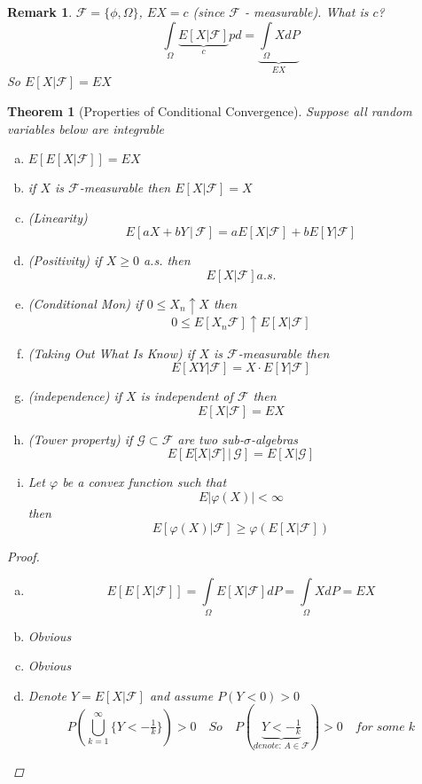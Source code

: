 \documentclass[12pt]{article}
\def\FF{\mathbb{F}}
\def\FF{\mathcal{F}}
\newtheorem{theorem}{Theorem}[section]
\newtheorem*{remark}{Remark}
\begin{document}
\begin{framed} \begin{remark}
$\mathcal{F} = \{\phi, \Omega\}$, $EX = c$ (since $\mathcal{F}$ - measurable). What is $c$?
\[\int\limits_{\Omega}\underbrace{E[X|\mathcal{F}]}_{c}pd = \underbrace{\int\limits_{\Omega}XdP}_{EX}\]
So $E[X|\mathcal{F}] = EX$
\end{remark}
\end{framed}

\begin{theorem}[Properties of Conditional Convergence]
Suppose all random variables below are integrable
\begin{enumerate}[(a)]
\item $E\left[E[X|\FF]\right] = EX$
\item if $X$ is $\FF$-measurable then $E[X|\FF]=X$
\item (Linearity) \[E[aX + bY \, |\,\FF] = aE[X|\FF] + bE[Y|\FF]\]
\item (Positivity) if $X\geq 0$ a.s. then \[E[X |\FF] a.s.\] 
\item (Conditional Mon) if $0 \leq X_n \uparrow X$ then 
\[0\leq E[X_n \FF] \uparrow E[X |\FF]\]
\item (Taking Out What Is Know) if $X$ is $\FF$-measurable then 
\[E[XY|\FF] = X\cdot E[Y|\FF]\]
\item (independence)  if $X$ is  independent of $\FF$ then 
\[E[X|\FF] = EX\]
\item (Tower property) if $\mathcal{G}\subset \FF$ are two sub-$\sigma$-algebras
\[E\left[E[X|\FF] \,| \,\mathcal{G}\right] = E[X|\mathcal{G}] \] 
\item Let $\varphi$ be a convex function such that
\[E|\varphi(X)|< \infty\]
then
\[E[\varphi(X)|\FF] \geq \varphi\left( E[X|\FF]\right) \]
\end{enumerate}
\begin{proof}\quad \\ \begin{enumerate}[(a):]
\item \[E\left[E[X|\FF]\right] =\int\limits_{\Omega}E[X|\FF] dP =\int\limits_{\Omega}XdP =  EX\]
\item Obvious\\
\item Obvious \\
\item Denote $Y = E[X|\FF]$ and assume $P(Y<0)>0$
\[P\left(\bigcup_{k=1}^{\infty} \{Y<-\tfrac{1}{k}\}\right) >0 \quad So \quad P\left( \underbrace{Y < -\tfrac{1}{k}}_{denote:\, A \in \FF} \right) > 0 \quad for \; some \; k \]

\end{enumerate}
\end{proof}
\end{theorem}
\end{document}
